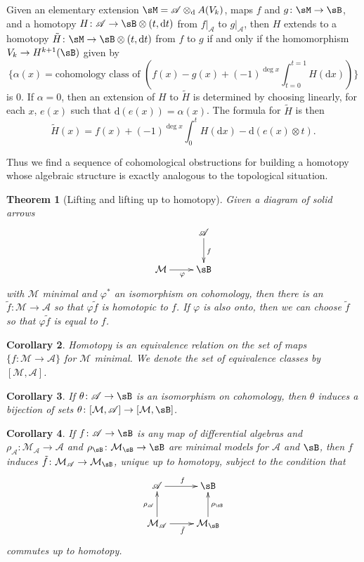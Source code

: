 \documentclass[11pt]{amsart}
\theoremstyle{plain}
\newtheorem{theorem}{Theorem}[section]
\newtheorem{corollary}[theorem]{Corollary}
\theoremstyle{definition}
\newcommand{\sA}{\mathscr{A}}
\newcommand{\cM}{\mathcal{M}}
\newcommand{\dd}{\mathrm{d}}
\begin{document}
Given an elementary extension $\sM = \sA \otimes_{\dd} A(V_{k})$, maps $f$ and $g \colon \sM \to \sB$, and a homotopy $H \colon \sA \to \sB \otimes (t, \dd t)$ from $f|_{\sA}$ to $g|_{\sA}$, then $H$ extends to a homotopy $\tilde{H} \colon \sM \to \sB \otimes (t, \dd t)$ from $f$ to $g$ if and only if the homomorphism $V_{k} \to H^{k+1}(\sB)$ given by
\[
\{\alpha(x) = \text{cohomology class of } (f(x) - g(x) + (-1)^{\deg x} \textstyle\int_{t=0}^{t=1} H(\dd x))\}
\]
is $0$. If $\alpha = 0$, then an extension of $H$ to $\tilde{H}$ is determined by choosing linearly, for each $x$, $e(x)$ such that $\dd(e(x)) = \alpha(x)$. The formula for $\tilde{H}$ is then
\[
\tilde{H}(x) = f(x) + (-1)^{\deg x} \textstyle\int_{0}^{t} H(\dd x) - \dd(e(x) \otimes t).
\]

Thus we find a sequence of cohomological obstructions for building a homotopy whose algebraic structure is exactly analogous to the topological situation.

\begin{theorem}[Lifting and lifting up to homotopy]\label{thm:1.2}
Given a diagram of solid arrows
\[
\xymatrix{
& \sA \ar[d]^{f} \\
\cM \ar[r]_{\varphi} & \sB
}
\]
with $\cM$ minimal and $\varphi^{*}$ an isomorphism on cohomology, then there is an $\tilde{f} \colon \cM \to \sA$ so that $\varphi \tilde{f}$ is homotopic to $f$. If $\varphi$ is also onto, then we can choose $\tilde{f}$ so that $\varphi \tilde{f}$ is equal to $f$.
\end{theorem}

\begin{corollary}\label{cor:1.3}
Homotopy is an equivalence relation on the set of maps $\{f \colon \cM \to \sA\}$ for $\cM$ minimal. We denote the set of equivalence classes by $[\cM, \sA]$.
\end{corollary}

\begin{corollary}\label{cor:1.4}
If $\theta \colon \sA \to \sB$ is an isomorphism on cohomology, then $\theta$ induces a bijection of sets $\theta \colon [\cM, \sA] \to [\cM, \sB]$.
\end{corollary}

\begin{corollary}\label{cor:1.5}
If $f \colon \sA \to \sB$ is any map of differential algebras and $\rho_{\sA} \colon \cM_{\sA} \to \sA$ and $\rho_{\sB} \colon \cM_{\sB} \to \sB$ are minimal models for $\sA$ and $\sB$, then $f$ induces $\tilde{f} \colon \cM_{\sA} \to \cM_{\sB}$, unique up to homotopy, subject to the condition that
\[
\xymatrix{
\sA \ar[r]^{f} & \sB \\
\cM_{\sA} \ar[u]^{\rho_{\sA}} \ar[r]_{\tilde{f}} & \cM_{\sB} \ar[u]_{\rho_{\sB}}
}
\]
commutes up to homotopy.
\end{corollary}
\end{document}
